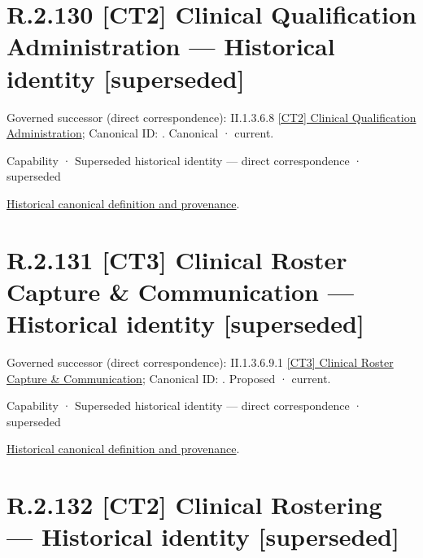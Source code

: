 \section*{R.2.130 [CT2] Clinical Qualification Administration — Historical identity [superseded]}
\label{navigation:R.2.130}

{\small Governed successor (direct correspondence): II.1.3.6.8 \hyperref[element:0511a705d74a4f48a0ce92590ae764fa]{[CT2] Clinical Qualification Administration}; Canonical ID: \texttt{}. Canonical · current.}\par
\label{element:5fea7aaac4384245b1f08a3d8a076bd9}
{\small Capability · Superseded historical identity — direct correspondence · superseded}\par
\href{../../../../continuum/strategy/capability/5fea7aaac4384245b1f08a3d8a076bd9.md}{Historical canonical definition and provenance}.\par
\section*{R.2.131 [CT3] Clinical Roster Capture \& Communication — Historical identity [superseded]}
\label{navigation:R.2.131}

{\small Governed successor (direct correspondence): II.1.3.6.9.1 \hyperref[element:8243cba81fb6449781d10823ae194237]{[CT3] Clinical Roster Capture \& Communication}; Canonical ID: \texttt{}. Proposed · current.}\par
\label{element:2054d57bb33a4361b3ef0824545a1784}
{\small Capability · Superseded historical identity — direct correspondence · superseded}\par
\href{../../../../continuum/strategy/capability/2054d57bb33a4361b3ef0824545a1784.md}{Historical canonical definition and provenance}.\par
\section*{R.2.132 [CT2] Clinical Rostering — Historical identity [superseded]}
\label{navigation:R.2.132}


